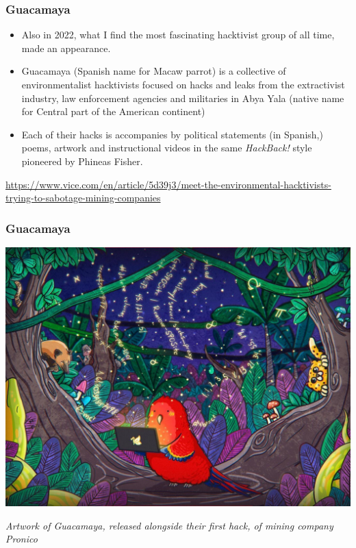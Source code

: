 \documentclass[aspectratio=169,usenames,dvipsnames]{beamer}
\begin{document}
\begin{frame}
  \frametitle{Guacamaya}

  \begin{itemize}[<+->]
    \item Also in 2022, what I find the most fascinating
      hacktivist group of all time, made an appearance.
    \item Guacamaya (Spanish name for Macaw parrot) is a collective of
      environmentalist hacktivists focused on hacks and leaks from the
      extractivist industry, law enforcement agencies and militaries in Abya
      Yala (native name for Central part of the American continent)
    \item Each of their hacks is accompanies by political statements (in
      Spanish,) poems, artwork and instructional videos in the same
      \emph{HackBack!} style pioneered by Phineas Fisher.
  \end{itemize}

  \vfill
  \footnotesize \centering \pause
  \url{https://www.vice.com/en/article/5d39j3/meet-the-environmental-hacktivists-trying-to-sabotage-mining-companies}

\end{frame}

\begin{frame}[c]
  \frametitle{Guacamaya}

  \centering
  \includegraphics[width=\textwidth,height=0.7\textheight,keepaspectratio]{img/guacamaya.jpg}

  \footnotesize
  \emph{Artwork of Guacamaya, released alongside their first hack, of mining
  company Pronico}

\end{frame}
\end{document}

